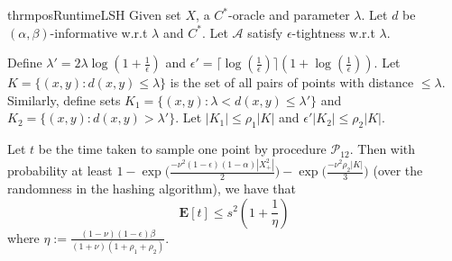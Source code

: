 \documentclass[12pt]{article}
\newcommand{\mb}{\mathbf}
\newcommand{\mc}{\mathcal}
\begin{document}
\begin{restatable}{thrm}{posRuntimeLSH}
\label{thm:posRuntimeLSH}
Given set $X$, a $C^*$-oracle and parameter $\lambda$. Let $d$ be $(\alpha, \beta)$-informative w.r.t $\lambda$ and $C^*$. Let $\mc A$ satisfy $\epsilon$-tightness w.r.t $\lambda$. 

Define $\lambda' = 2\lambda\log(1+\frac{1}{\epsilon})$ and $\epsilon' = \lceil \log(\frac{1}{\epsilon})\rceil (1+\log(\frac{1}{\epsilon}))$. Let $K = \{(x, y) : d(x, y) \le \lambda\}$ is the set of all pairs of points with distance $\le \lambda$. Similarly, define sets $K_1 = \{(x, y): \lambda < d(x, y) \le \lambda'\}$ and $K_2 = \{(x, y): d(x, y) > \lambda'\}$. Let $|K_1| \le \rho_1|K|$ and $\epsilon'|K_2| \le \rho_2|K|$. 

Let $t$ be the time taken to sample one point by procedure $\mc P_{12}$. Then with probability at least $1- \exp\Big(\frac{-\nu^2(1-\epsilon)(1-\alpha)|X^2_+|}{2}\Big)- \exp\Big(\frac{-\nu^2\rho_2 |K|}{3}\Big)$ (over the randomness in the hashing algorithm), we have that $$\mb E[t] \le s^2(1+\frac{1}{\eta})$$
where $\eta := \frac{(1-\nu)(1-\epsilon)\beta}{(1+\nu)(1+\rho_1+\rho_2)}$. 
\end{restatable}
\end{document}
